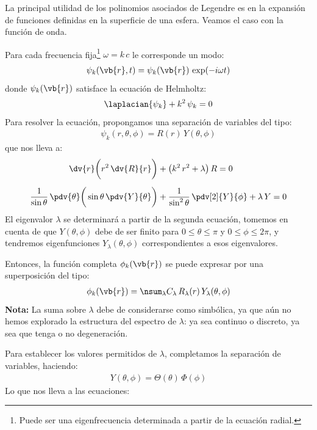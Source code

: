 La principal utilidad de los polinomios asociados de Legendre es en la expansión de funciones definidas en la superficie de una esfera. Veamos el caso con la función de onda.
\par
Para cada frecuencia fija\footnote{Puede ser una eigenfrecuencia determinada a partir de la ecuación radial.} $\omega = k \, c$ le corresponde un modo:
\begin{align*}
\psi_{k} (\vb{r}, t) = \psi_{k} (\vb{r}) \, \exp(- i \omega t)
\end{align*}
donde $\psi_{k} (\vb{r})$ satisface la ecuación de Helmholtz:
\begin{align*}
\laplacian{\psi_{k}} + k^{2} \, \psi_{k} = 0
\end{align*}
Para resolver la ecuación, propongamos una separación de variables del tipo:
\begin{align*}
\psi_{k} (r, \theta, \phi) = R (r) \, Y (\theta, \phi)
\end{align*}
que nos lleva a:
\begin{align*}
\dv{r} \bigg( r^{2} \, \dv{R}{r} \bigg) &+ \big( k^{2} \, r^{2} + \lambda \big) \, R = 0 \\[0.5em]
\dfrac{1}{\sin \theta} \, \pdv{\theta} \bigg( \sin \theta \, \pdv{Y}{\theta} \bigg) &+ \dfrac{1}{\sin^{2} \theta} \, \pdv[2]{Y}{\phi} + \lambda \, Y = 0
\end{align*}
El eigenvalor $\lambda$ se determinará a partir de la segunda ecuación, tomemos en cuenta de que $Y (\theta, \phi)$ debe de ser finito para $0 \leq \theta \leq \pi$ y $0 \leq \phi \leq 2 \pi$, y tendremos eigenfunciones $Y_{\lambda} (\theta, \phi)$ correspondientes a esos eigenvalores.
\par
Entonces, la función completa $\phi_{k} (\vb{r})$ se puede expresar por una superposición del tipo:
\begin{align*}
\phi_{k} (\vb{r}) = \nsum_{\lambda} C_{\lambda} \, R_{\lambda} (r) \, Y_{\lambda} (\theta, \phi)
\end{align*}
\textbf{Nota: } La suma sobre $\lambda$ debe de considerarse como simbólica, ya que aún no hemos explorado la estructura del espectro de $\lambda$: ya sea continuo o discreto, ya sea que tenga o no degeneración.
\par
Para establecer los valores permitidos de $\lambda$, completamos la separación de variables, haciendo:
\begin{align*}
Y (\theta, \phi) = \Theta (\theta) \, \Phi (\phi)
\end{align*}
Lo que nos lleva a las ecuaciones:
